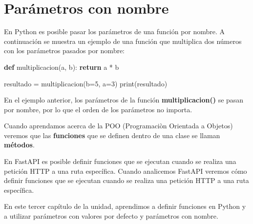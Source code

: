 \documentclass[
  a4paper,
  DIV=11,
  numbers=noendperiod,
  onepage,
  openany]{scrreprt}
\newenvironment{Shaded}{\begin{snugshade}}{\end{snugshade}}
\newcommand{\BuiltInTok}[1]{\textcolor[rgb]{0.00,0.23,0.31}{#1}}
\newcommand{\ControlFlowTok}[1]{\textcolor[rgb]{0.00,0.23,0.31}{\textbf{#1}}}
\newcommand{\DecValTok}[1]{\textcolor[rgb]{0.68,0.00,0.00}{#1}}
\newcommand{\KeywordTok}[1]{\textcolor[rgb]{0.00,0.23,0.31}{\textbf{#1}}}
\newcommand{\NormalTok}[1]{\textcolor[rgb]{0.00,0.23,0.31}{#1}}
\newcommand{\OperatorTok}[1]{\textcolor[rgb]{0.37,0.37,0.37}{#1}}
\begin{document}
\section{Parámetros con nombre}\label{paruxe1metros-con-nombre}

En Python es posible pasar los parámetros de una función por nombre. A
continuación se muestra un ejemplo de una función que multiplica dos
números con los parámetros pasados por nombre:

\begin{Shaded}
\begin{Highlighting}[]
\KeywordTok{def}\NormalTok{ multiplicacion(a, b):}
    \ControlFlowTok{return}\NormalTok{ a }\OperatorTok{*}\NormalTok{ b}

\NormalTok{resultado }\OperatorTok{=}\NormalTok{ multiplicacion(b}\OperatorTok{=}\DecValTok{5}\NormalTok{, a}\OperatorTok{=}\DecValTok{3}\NormalTok{)}
\BuiltInTok{print}\NormalTok{(resultado)}
\end{Highlighting}
\end{Shaded}

En el ejemplo anterior, los parámetros de la función
\textbf{multiplicacion()} se pasan por nombre, por lo que el orden de
los parámetros no importa.

\begin{tcolorbox}[enhanced jigsaw, toprule=.15mm, title=\textcolor{quarto-callout-tip-color}{\faLightbulb}\hspace{0.5em}{Tip}, opacitybacktitle=0.6, colbacktitle=quarto-callout-tip-color!10!white, toptitle=1mm, breakable, left=2mm, coltitle=black, colback=white, bottomrule=.15mm, colframe=quarto-callout-tip-color-frame, bottomtitle=1mm, arc=.35mm, titlerule=0mm, opacityback=0, rightrule=.15mm, leftrule=.75mm]

Cuando aprendamos acerca de la POO (Programaciòn Orientada a Objetos)
veremos que las \textbf{funciones} que se definen dentro de una clase se
llaman \textbf{métodos}.

\end{tcolorbox}

En FastAPI es posible definir funciones que se ejecutan cuando se
realiza una petición HTTP a una ruta específica. Cuando analicemos
FastAPI veremos cómo definir funciones que se ejecutan cuando se realiza
una petición HTTP a una ruta específica.

En este tercer capítulo de la unidad, aprendimos a definir funciones en
Python y a utilizar parámetros con valores por defecto y parámetros con
nombre.
\end{document}
